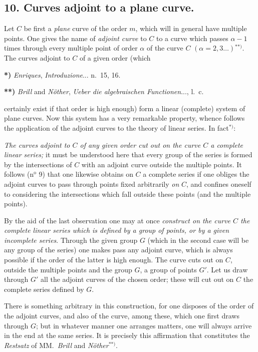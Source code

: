 \documentclass{article}
\begin{document}
\subsection*{10. Curves adjoint to a plane curve.}

Let $C$ be first a \emph{plane} curve of the order $m$, which will in general have multiple points. One gives the name of \emph{adjoint curve} to $C$ to a curve which passes $\alpha - 1$ times through every multiple point of order $\alpha$ of the curve $C$ $(\alpha = 2, 3 \ldots)$${}^{**)}$. The curves adjoint to $C$ of a given order (which

\textbf{*)} \emph{Enriques}, \emph{Introduzione}... n.\ 15, 16.

\textbf{**)} \emph{Brill} and \emph{Nöther}, \emph{Ueber die algebraischen Functionen}..., l.\ c.

certainly exist if that order is high enough) form a linear (complete) system of plane curves. Now this system has a very remarkable property, whence follows the application of the adjoint curves to the theory of linear series. In fact${}^{*)}$:

\emph{The curves adjoint to $C$ of any given order cut out on the curve $C$ a complete linear series;} it must be understood here that every group of the series is formed by the intersections of $C$ with an adjoint curve outside the multiple points. It follows (n${}^{\text{o}}$ 9) that one likewise obtains on $C$ a complete series if one obliges the adjoint curves to pass through points fixed arbitrarily \emph{on} $C$, and confines oneself to considering the intersections which fall outside these points (and the multiple points).

By the aid of the last observation one may at once \emph{construct on the curve $C$ the complete linear series which is defined by a group of points, or by a given incomplete series}. Through the given group $G$ (which in the second case will be any group of the series) one makes pass any adjoint curve, which is always possible if the order of the latter is high enough. The curve cuts out on $C$, outside the multiple points and the group $G$, a group of points $G'$. Let us draw through $G'$ all the adjoint curves of the chosen order; these will cut out on $C$ the complete series defined by $G$.

There is something arbitrary in this construction, for one disposes of the order of the adjoint curves, and also of the curve, among these, which one first draws through $G$; but in whatever manner one arranges matters, one will always arrive in the end at the same series. It is precisely this affirmation that constitutes the \emph{Restsatz} of MM.\ \emph{Brill} and \emph{Nöther}${}^{**)}$.
\end{document}
